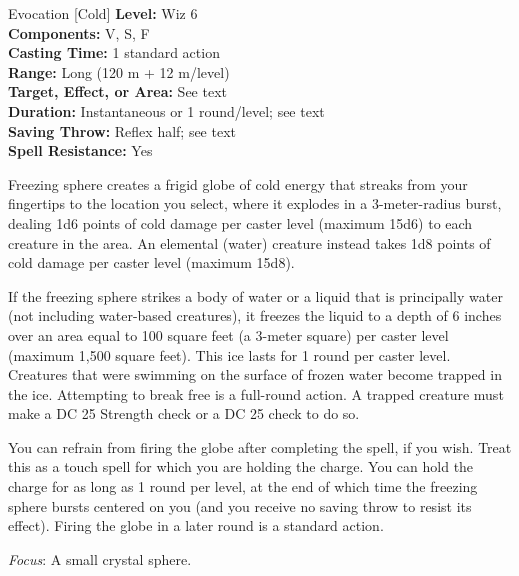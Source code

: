{Evocation [Cold]}
{
	\textbf{Level:}
	Wiz 6\\
	\textbf{Components:}
	V, S, F\\
	\textbf{Casting Time:}
	1 standard action\\
	\textbf{Range:}
	Long (120 m + 12 m/level)\\
	\textbf{Target, Effect, or Area:}
	See text\\
	\textbf{Duration:}
	Instantaneous or 1 round/level; see text\\
	\textbf{Saving Throw:}
	Reflex half; see text\\
	\textbf{Spell Resistance:}
	Yes\\
}
{
	Freezing sphere creates a frigid globe of cold energy that streaks from your fingertips to the location you select, where it explodes in a 3-meter-radius burst, dealing 1d6 points of cold damage per caster level (maximum 15d6) to each creature in the area. An elemental (water) creature instead takes 1d8 points of cold damage per caster level (maximum 15d8).

	If the freezing sphere strikes a body of water or a liquid that is principally water (not including water-based creatures), it freezes the liquid to a depth of 6 inches over an area equal to 100 square feet (a 3-meter square) per caster level (maximum 1,500 square feet). This ice lasts for 1 round per caster level. Creatures that were swimming on the surface of frozen water become trapped in the ice. Attempting to break free is a full-round action. A trapped creature must make a DC 25 Strength check or a DC 25  check to do so.

	You can refrain from firing the globe after completing the spell, if you wish. Treat this as a touch spell for which you are holding the charge. You can hold the charge for as long as 1 round per level, at the end of which time the freezing sphere bursts centered on you (and you receive no saving throw to resist its effect). Firing the globe in a later round is a standard action.

	\textit{Focus}:
	A small crystal sphere.

}
